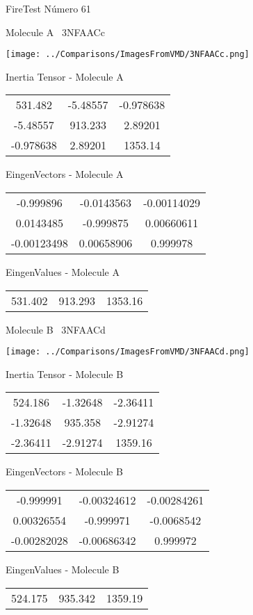 \vtab[-3cm]
\begin{center}
{\large FireTest \tab Número 61}
\end{center}
\begin{multicols}{2}
\begin{center}

Molecule A \
3NFAACc

\texttt{[image: ../Comparisons/ImagesFromVMD/3NFAACc.png]}

Inertia Tensor - Molecule A \\
\begin{tabular}{|c c c|}
531.482	 & 	-5.48557	 & 	-0.978638	 \\
-5.48557	 & 	913.233	 & 	2.89201	 \\
-0.978638	 & 	2.89201	 & 	1353.14
\end{tabular}

\vtab
 EingenVectors - Molecule A     \\
\begin{tabular}{|c c c|}
-0.999896	 & 	-0.0143563	 & 	-0.00114029	 \\
0.0143485	 & 	-0.999875	 & 	0.00660611	 \\
-0.00123498	 & 	0.00658906	 & 	0.999978
\end{tabular}

\vtab
 EingenValues - Molecule A     \\
\begin{tabular}{|c c c|}
531.402	 & 	913.293	 & 	1353.16	 \\
\end{tabular}
\columnbreak

Molecule B \
3NFAACd

\texttt{[image: ../Comparisons/ImagesFromVMD/3NFAACd.png]}

Inertia Tensor - Molecule B \\
\begin{tabular}{|c c c|}
524.186	 & 	-1.32648	 & 	-2.36411	 \\
-1.32648	 & 	935.358	 & 	-2.91274	 \\
-2.36411	 & 	-2.91274	 & 	1359.16
\end{tabular}

\vtab
 EingenVectors - Molecule B     \\
\begin{tabular}{|c c c|}
-0.999991	 & 	-0.00324612	 & 	-0.00284261	 \\
0.00326554	 & 	-0.999971	 & 	-0.0068542	 \\
-0.00282028	 & 	-0.00686342	 & 	0.999972
\end{tabular}

\vtab
 EingenValues - Molecule B     \\
\begin{tabular}{|c c c|}
524.175	 & 	935.342	 & 	1359.19	 \\
\end{tabular}

\end{center}
\end{multicols}

